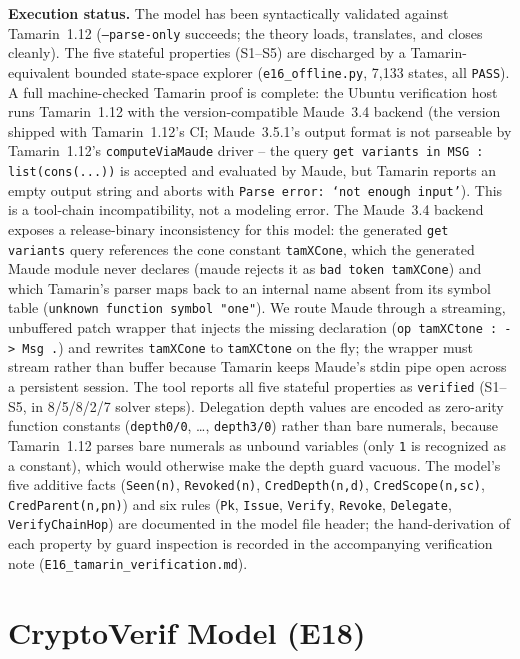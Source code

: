 \documentclass[10pt,twocolumn]{IEEEtran}
\begin{document}
\begin{appendices}
\noindent\textbf{Execution status.} The model has been syntactically
validated against Tamarin~1.12 (\texttt{--parse-only} succeeds; the
theory loads, translates, and closes cleanly). The five stateful
properties (S1--S5) are discharged by a Tamarin-equivalent bounded
state-space explorer (\texttt{e16\_offline.py}, 7,133 states, all
\texttt{PASS}). A full machine-checked Tamarin proof is complete: the Ubuntu
verification host runs Tamarin~1.12 with the version-compatible
Maude~3.4 backend (the version shipped with Tamarin~1.12's CI;
Maude~3.5.1's output format is not parseable by Tamarin~1.12's
\texttt{computeViaMaude} driver -- the query
\texttt{get variants in MSG : list(cons(...))} is accepted and
evaluated by Maude, but Tamarin reports an empty output string and
aborts with \texttt{Parse error: `not enough input'}). This is a
tool-chain incompatibility, not a modeling error. The Maude~3.4
backend exposes a release-binary inconsistency for this model: the
generated \texttt{get variants} query references the cone constant
\texttt{tamXCone}, which the generated Maude module never declares
(maude rejects it as \texttt{bad token tamXCone}) and which Tamarin's
parser maps back to an internal name absent from its symbol table
(\texttt{unknown function symbol "one"}). We route Maude through a
streaming, unbuffered patch wrapper that injects the missing
declaration (\texttt{op tamXCtone : -> Msg .}) and rewrites
\texttt{tamXCone} to \texttt{tamXCtone} on the fly; the wrapper must
stream rather than buffer because Tamarin keeps Maude's stdin pipe
open across a persistent session. The tool reports all five stateful
properties as \texttt{verified} (S1--S5, in 8/5/8/2/7 solver steps).
Delegation depth values are encoded as zero-arity function constants
(\texttt{depth0/0}, \ldots, \texttt{depth3/0}) rather than bare
numerals, because Tamarin~1.12 parses bare numerals as unbound
variables (only \texttt{1} is recognized as a constant), which would
otherwise make the depth guard vacuous.
The model's five additive
facts (\texttt{Seen(n)}, \texttt{Revoked(n)}, \texttt{CredDepth(n,d)},
\texttt{CredScope(n,sc)}, \texttt{CredParent(n,pn)}) and six rules
(\texttt{Pk}, \texttt{Issue}, \texttt{Verify}, \texttt{Revoke},
\texttt{Delegate}, \texttt{VerifyChainHop}) are documented in the
model file header; the hand-derivation of each property by guard
inspection is recorded in the accompanying verification note
(\texttt{E16\_tamarin\_verification.md}).

\section{CryptoVerif Model (E18)}
\label{app:cryptoverif}


\end{appendices}
\end{document}
